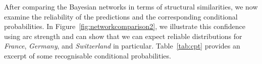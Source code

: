 \documentclass[twoside,twocolumn]{article}
\begin{document}
After comparing the Bayesian networks in terms of structural similarities, we now examine the reliability of the predictions and the corresponding conditional probabilities. In Figure~\ref{fig:networkcomparison2}, we illustrate this confidence using arc strength and can show that we can expect reliable distributions for \textsl{France}, \textsl{Germany}, and  \textsl{Switzerland} in particular. Table~\ref{tab:cpt} provides an excerpt of some recognisable conditional probabilities.
\begin{figure}
\end{figure}
\end{document}
